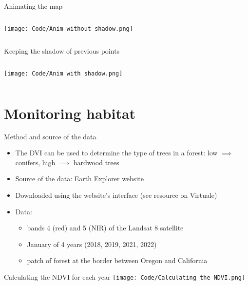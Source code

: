 \documentclass{beamer}
\begin{document}
\begin{frame}{Animating the map}
    \begin{columns}
            \texttt{[image: Code/Anim without shadow.png]}
    \end{columns}
\end{frame}

\begin{frame}{Keeping the shadow of previous points}
    \begin{columns}
            \texttt{[image: Code/Anim with shadow.png]}
    \end{columns}
\end{frame}

\section{Monitoring habitat}

\begin{frame}{Method and source of the data}
    \begin{itemize}
        \item The DVI can be used to determine the type of trees in a forest: low $\implies$ conifers, high $\implies$ hardwood trees
        \item Source of the data: Earth Explorer website
        \item Downloaded using the website's interface (see resource on Virtuale)
        \item Data: 
        \begin{itemize}
            \item bands 4 (red) and 5 (NIR) of the Landsat 8 satellite
            \item January of 4 years (2018, 2019, 2021, 2022)
            \item patch of forest at the border between Oregon and California
        \end{itemize}
    \end{itemize}
\end{frame}

\begin{frame}{Calculating the NDVI for each year}
    \texttt{[image: Code/Calculating the NDVI.png]}
\end{frame}
\end{document}
